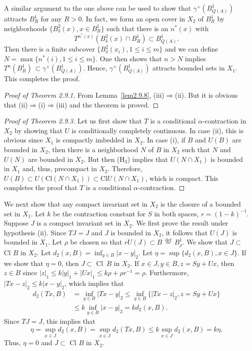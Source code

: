 \documentclass{surv-l}
\theoremstyle{plain}
\theoremstyle{definition}
\numberwithin{equation}{section}
\numberwithin{figure}{chapter}
\begin{document}
A similar argument to the one above can be used to show that $\gamma^{+}(B_{Q(A)}^{1})$ attracts $B_{R}^{1}$ for any $R>0$. In fact, we form an open cover in $X_{2}$ of $B_{R}^{1}$ by neighborhoods $\{B_{\delta}^{2}(x), x\in B_{R}^{1}\}$ such that there is an $n^{\ast}(x)$ with
\begin{equation*}
T^{{n^{\ast}(x)}}(B_{\delta}^{2}(x)\cap B_{R}^{1})\subset B_{Q(A)}^{1}.
\end{equation*}
Then there is a finite subcover $\{B_{\delta}^{2}(x_{i}), 1\leq i\leq m\}$ and we can define $N= \max\{n^{\ast}(i), 1\leq i\leq m\}$. One then shows that $n>N$ implies $T^{n}(B_{R}^{1})\, \subset \gamma^{+}(B_{Q(A)}^{1})$. Hence, $\gamma^{+}(B_{Q(A)}^{1})$ attracts bounded sets in $X_{1}$. This completes the proof.

\begin{proof}[Proof of Theorem 2.9.1]\label{pot2.9.1} From Lemma~\ref{lem2.9.8}, (iii)$\Rightarrow$(ii). But it is obvious that
(ii)$\Rightarrow$(i)$\Rightarrow$(iii) and the theorem is proved.
\end{proof}

\begin{proof}[Proof of Theorem 2.9.3] Let us first show that $T$ is a conditional $\alpha$-contraction in $X_{2}$ by showing that $U$ is conditionally completely continuous. In case (ii), this is obvious since $X_{1}$ is compactly imbedded in $X_{2}$. In case (i), if $B$ and $U(B)$ are bounded in $X_{2}$, then there is a neighborhood $N$ of $B$ in $X_{2}$ such that $N$ and $U(N)$ are bounded in $X_{2}$. But then (H$_{3}$) implies that $U(N\cap X_{1})$ is bounded in $X_{1}$ and, thus, precompact in $X_{2}$. Therefore, $U(B)\subset U(\mathrm{Cl}(N\cap X_{1}))\subset \mathrm{Cl}U(N\cap X_{1})$, which is compact. This completes the proof that $T$ is a conditional $\alpha$-contraction.
\end{proof}


We next show that any compact invariant set in $X_{2}$ is the closure of a bounded set in $X_{1}$. Let $k$ be the contraction constant for $S$ in both spaces, $r=(1-k)^{-1}$. Suppose $J$ is a compact invariant set in $X_{2}$. We first prove the result under hypothesis (ii). Since $TJ=J$ and $J$ is bounded in $X_{2}$, it follows that $U(J)$ is bounded in $X_{1}$. Let $\rho$ be chosen so that $rU(J)\subset B\,{\overset{\mathrm{def}}{=}}\,B_{\rho}^{1}$. We show that $ J\subset$ Cl $B$ in $X_{2}$. Let $d_{2}(x, B)=\inf_{y\in B}|x-y|_{2}$. Let $\eta=\sup\{d_{2}(x, B), x\in J\}$. If we show that $\eta=0$, then $ J\subset$ Cl~$B$ in $X_{2}$. If $x\in J, y\in B, z=Sy+Ux$, then $z\in B$ since $|z|_{1}\leq k|y|_{1}+|Ux|_{1}\leq k\rho+\rho r^{-1}=\rho$. Furthermore, $|Tx-z|_{2}\leq k|x-y|_{2}$, which implies that
\begin{align*}
d_{2}(Tx, B)&=\inf_{y\in B}|Tx-y|_{2}\leq\inf_{y\in B}\{|Tx-z|_{2}, z=Sy+Ux\}\\
&\leq k\inf_{y\in B}|x-y|_{2}=kd_{2}(x, B).
\end{align*}
Since $TJ=J$, this implies that
\begin{equation*}
\eta=\sup_{x\in J}d_{2}(x, B)=\sup_{x\in J}d_{2}(Tx, B)\leq k\sup_{x\in J}d_{2}(x, B)=k\eta.
\end{equation*}
Thus, $\eta=0$ and $ J\subset$ Cl $B$ in $X_{2}$.
\end{document}
